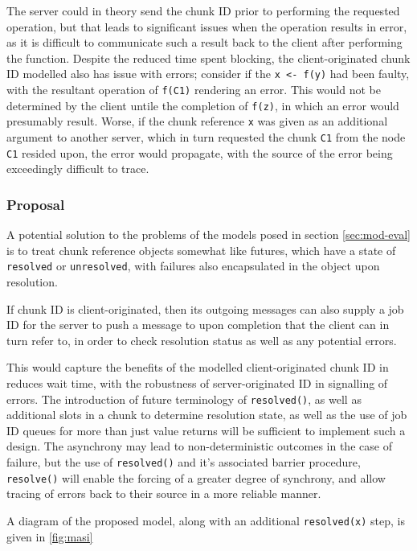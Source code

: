 The server could in theory send the chunk ID prior to performing the requested
operation, but that leads to significant issues when the operation results in
error, as it is difficult to communicate such a result back to the client after
performing the function.
Despite the reduced time spent blocking, the client-originated chunk ID
modelled also has issue with errors; consider if the \texttt{x <- f(y)} had
been faulty, with the resultant operation of \texttt{f(C1)} rendering an error.
This would not be determined by the client untile the completion of
\texttt{f(z)}, in which an error would presumably result.
Worse, if the chunk reference \texttt{x} was given as an additional argument to
another server, which in turn requested the chunk \texttt{C1} from the node
\texttt{C1} resided upon, the error would propagate, with the source of the
error being exceedingly difficult to trace.

\subsubsection{Proposal}

A potential solution to the problems of the models posed in section
\cref{sec:mod-eval} is to treat chunk reference objects somewhat like futures,
which have a state of \texttt{resolved} or \texttt{unresolved}, with failures
also encapsulated in the object upon resolution\cite{bengtsson19:future-r}.

If chunk ID is client-originated, then its outgoing messages can also supply a
job ID for the server to push a message to upon completion that the client can
in turn refer to, in order to check resolution status as well as any potential
errors.

This would capture the benefits of the modelled client-originated chunk ID in
reduces wait time, with the robustness of server-originated ID in signalling of
errors.
The introduction of future terminology of \texttt{resolved()}, as well as
additional slots in a chunk to determine resolution state, as well as the use
of job ID queues for more than just value returns will be sufficient to
implement such a design.
The asynchrony may lead to non-deterministic outcomes in the case of failure,
but the use of \texttt{resolved()} and it's associated barrier procedure,
\texttt{resolve()} will enable the forcing of a greater degree of synchrony,
and allow tracing of errors back to their source in a more reliable manner.

A diagram of the proposed model, along with an additional \texttt{resolved(x)}
step, is given in \cref{fig:masi}

